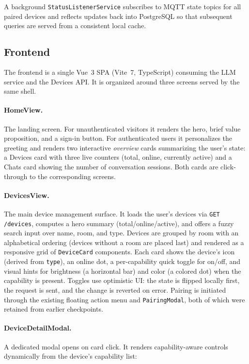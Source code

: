 \documentclass[a4paper,12pt]{article}
\begin{document}
A background \verb|StatusListenerService| subscribes to MQTT state topics for all paired devices and reflects updates back into PostgreSQL so that subsequent queries are served from a consistent local cache.

\subsection{Frontend}

The frontend is a single Vue~3 SPA (Vite~7, TypeScript) consuming the LLM service and the Devices API. It is organized around three screens served by the same shell.

\paragraph{HomeView.} The landing screen. For unauthenticated visitors it renders the hero, brief value proposition, and a sign-in button. For authenticated users it personalizes the greeting and renders two interactive \emph{overview} cards summarizing the user's state: a Devices card with three live counters (total, online, currently active) and a Chats card showing the number of conversation sessions. Both cards are click-through to the corresponding screens.

\paragraph{DevicesView.} The main device management surface. It loads the user's devices via \verb|GET /devices|, computes a hero summary (total/online/active), and offers a fuzzy search input over name, room, and type. Devices are grouped by room with an alphabetical ordering (devices without a room are placed last) and rendered as a responsive grid of \verb|DeviceCard| components. Each card shows the device's icon (derived from \verb|type|), an online dot, a per-capability quick toggle for on/off, and visual hints for brightness (a horizontal bar) and color (a colored dot) when the capability is present. Toggles use optimistic UI: the state is flipped locally first, the request is sent, and the change is reverted on error. Pairing is initiated through the existing floating action menu and \verb|PairingModal|, both of which were retained from earlier checkpoints.

\paragraph{DeviceDetailModal.} A dedicated modal opens on card click. It renders capability-aware controls dynamically from the device's capability list:
\end{document}
